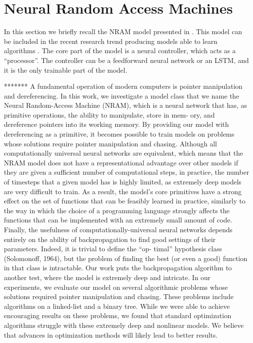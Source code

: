 \section{Neural Random Access Machines}
In this section we briefly recall the NRAM model presented in \cite{NRAM:2016}.  
This model can be included in the recent research trend producing models able to learn algorithms \cite{NTM,Joulin2015InferringAP}.  The core part of the model is a neural controller, which acts
as a “processor”. The controller can be a feedforward neural network or an LSTM, and it is the only
trainable part of the model.


*******
A fundamental operation of modern computers is pointer manipulation and dereferencing.  In this
work, we investigate a model class that we name the Neural Random-Access Machine (NRAM),
which is a neural network that has, as primitive operations, the ability to manipulate, store in mem-
ory, and dereference pointers into its working memory. By providing our model with dereferencing
as a primitive,  it becomes possible to train models on problems whose solutions require pointer
manipulation and chasing.  Although all computationally universal neural networks are equivalent,
which means that the NRAM model does not have a representational advantage over other models if
they are given a sufficient number of computational steps, in practice, the number of timesteps that
a given model has is highly limited, as extremely deep models are very difficult to train. As a result,
the model’s core primitives have a strong effect on the set of functions that can be feasibly learned
in practice, similarly to the way in which the choice of a programming language strongly affects the
functions that can be implemented with an extremely small amount of code.
Finally, the usefulness of computationally-universal neural networks depends entirely on the ability
of backpropagation to find good settings of their parameters.  Indeed, it is trivial to define the “op-
timal” hypothesis class (Solomonoff, 1964), but the problem of finding the best (or even a good)
function in that class is intractable.  Our work puts the backpropagation algorithm to another test,
where the model is extremely deep and intricate.
In our experiments, we evaluate our model on several algorithmic problems whose solutions required
pointer manipulation and chasing. These problems include algorithms on a linked-list and a binary
tree. While we were able to achieve encouraging results on these problems, we found that standard
optimization algorithms struggle with these extremely deep and nonlinear models.  We believe that
advances in optimization methods will likely lead to better results.